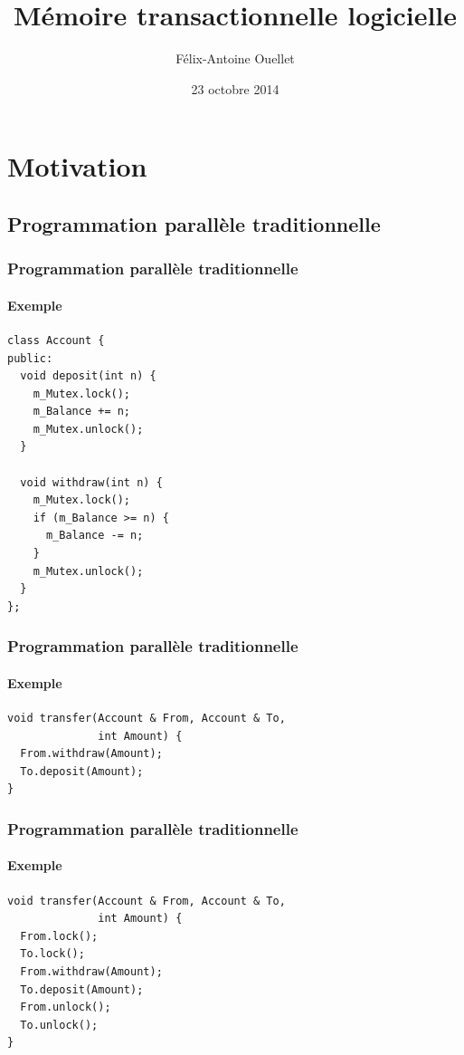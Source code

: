 \documentclass{beamer}
\author[Félix-Antoine Ouellet]{Félix-Antoine Ouellet}
\title[MTL\hspace{2em}\insertframenumber/\inserttotalframenumber]{Mémoire transactionnelle logicielle}
\institute{Université de Sherbrooke}
\date{23 octobre 2014}
\begin{document}
\begin{frame}
\titlepage %
\end{frame}

\begin{frame}
\tableofcontents[hideallsubsections]
\end{frame}

\section{Motivation}
\subsection{Programmation parallèle traditionnelle}

\newlength\someheight
\setlength\someheight{3.5cm}

\begin{frame}[fragile]
\frametitle{Programmation parallèle traditionnelle}
\framesubtitle{Exemple}
\begin{adjustbox}{width=\textwidth,height=\someheight,keepaspectratio}
\begin{lstlisting}
class Account {
public:
  void deposit(int n) {
    m_Mutex.lock();
    m_Balance += n;
    m_Mutex.unlock();
  }

  void withdraw(int n) {
    m_Mutex.lock();
    if (m_Balance >= n) {
      m_Balance -= n;
    }
    m_Mutex.unlock();
  }
};
\end{lstlisting}
\end{adjustbox}
\end{frame}

\begin{frame}[fragile]
\frametitle{Programmation parallèle traditionnelle}
\framesubtitle{Exemple}
\begin{lstlisting}
void transfer(Account & From, Account & To, 
              int Amount) {
  From.withdraw(Amount);
  To.deposit(Amount);
}
\end{lstlisting}
\end{frame}

\begin{frame}[fragile]
\frametitle{Programmation parallèle traditionnelle}
\framesubtitle{Exemple}
\begin{lstlisting}
void transfer(Account & From, Account & To, 
              int Amount) {
  From.lock();
  To.lock();
  From.withdraw(Amount);
  To.deposit(Amount);
  From.unlock();
  To.unlock();
}
\end{lstlisting}
\end{frame}
\end{document}

